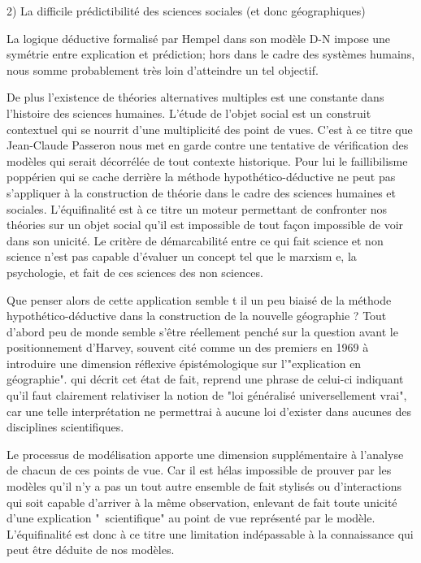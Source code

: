 {2) La difficile prédictibilité des sciences sociales (et donc géographiques)

La logique déductive formalisé par Hempel dans son modèle D-N impose une symétrie entre explication et prédiction; hors dans le cadre des systèmes humains, nous somme probablement très loin d'atteindre un tel objectif.

De plus l’existence de théories alternatives multiples est une constante dans l’histoire des sciences humaines. L'étude de l'objet social est un construit contextuel qui se nourrit d'une multiplicité des point de vues. C'est à ce titre que Jean-Claude Passeron \autocite{Passeron2006} nous met en garde contre une tentative de vérification des modèles qui serait décorrélée de tout contexte historique. Pour lui le faillibilisme poppérien qui se cache derrière la méthode hypothético-déductive ne peut pas s'appliquer à la construction de théorie dans le cadre des sciences humaines et sociales. L'équifinalité est à ce titre un moteur permettant de confronter nos théories sur un objet social  qu'il est impossible de tout façon impossible de voir dans son unicité. Le critère de démarcabilité entre ce qui fait science et non science n'est pas capable d'évaluer un concept tel que le marxism e, la psychologie, et fait de ces sciences des non sciences.

Que penser alors de cette application semble t il un peu biaisé de la méthode hypothético-déductive dans la construction de la nouvelle géographie ? Tout d'abord peu de monde semble s'être réellement penché sur la question avant le positionnement d'Harvey, souvent cité comme un des premiers en 1969 à introduire une dimension réflexive épistémologique sur l'"explication en géographie".\autocite{Johnston2002} qui décrit cet état de fait, reprend une phrase de celui-ci indiquant qu'il faut clairement relativiser la notion de "loi généralisé universellement vrai", car une telle interprétation ne permettrai à aucune loi d'exister dans aucunes des disciplines scientifiques.  

Le processus de modélisation apporte une dimension supplémentaire à l'analyse de chacun de ces points de vue. Car  il est hélas  impossible de prouver par les modèles qu'il n'y a pas un tout autre ensemble de fait stylisés ou d'interactions qui soit capable d'arriver à la même observation, enlevant de fait toute unicité d’une explication " scientifique" au point de vue représenté par le modèle. L'équifinalité est donc à ce titre une limitation indépassable à la connaissance qui peut être déduite de nos modèles.

}
